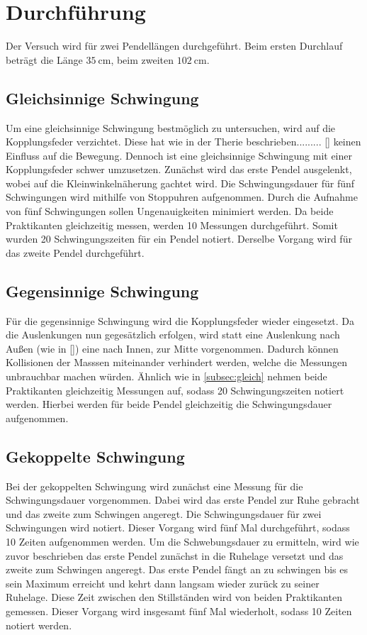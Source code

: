 \section{Durchführung}
\label{sec:Durchführung}
Der Versuch wird für zwei Pendellängen durchgeführt.
Beim ersten Durchlauf beträgt die Länge $\SI{35}{\centi\metre}$, beim zweiten $\SI{102}{\centi\metre}$.

\subsection{Gleichsinnige Schwingung}
\label{subsec:gleich}
Um eine gleichsinnige Schwingung bestmöglich zu untersuchen, wird auf die Kopplungsfeder verzichtet.
Diese hat wie in der Therie beschrieben......... \autoref{} keinen Einfluss auf die Bewegung.
Dennoch ist eine gleichsinnige Schwingung mit einer Kopplungsfeder schwer umzusetzen.
\noindent
Zunächst wird das erste Pendel ausgelenkt, wobei auf die Kleinwinkelnäherung gachtet wird.
Die Schwingungsdauer für fünf Schwingungen wird mithilfe von Stoppuhren aufgenommen.
Durch die Aufnahme von fünf Schwingungen sollen Ungenauigkeiten minimiert werden.
Da beide Praktikanten gleichzeitig messen, werden 10 Messungen durchgeführt.
Somit wurden 20 Schwingungszeiten für ein Pendel notiert.
Derselbe Vorgang wird für das zweite Pendel durchgeführt.

\subsection{Gegensinnige Schwingung}
Für die gegensinnige Schwingung wird die Kopplungsfeder wieder eingesetzt.
Da die Auslenkungen nun gegesätzlich erfolgen, wird statt eine Auslenkung nach Außen (wie in \autoref{})
eine nach Innen, zur Mitte vorgenommen. Dadurch können Kollisionen der Masssen miteinander verhindert werden,
welche die Messungen unbrauchbar machen würden.
Ähnlich wie in \autoref{subsec:gleich} nehmen beide Praktikanten gleichzeitig Messungen auf, sodass 20 Schwingungszeiten notiert werden.
Hierbei werden für beide Pendel gleichzeitig die Schwingungsdauer aufgenommen.

\subsection{Gekoppelte Schwingung}
Bei der gekoppelten Schwingung wird zunächst eine Messung für die Schwingungsdauer vorgenommen.
Dabei wird das erste Pendel zur Ruhe gebracht und das zweite zum Schwingen angeregt.
Die Schwingungsdauer für zwei Schwingungen wird notiert.
Dieser Vorgang wird fünf Mal durchgeführt, sodass 10 Zeiten aufgenommen werden.
\noindent
Um die Schwebungsdauer zu ermitteln, wird wie zuvor beschrieben das erste Pendel zunächst in die Ruhelage versetzt und das zweite zum Schwingen
angeregt.
Das erste Pendel fängt an zu schwingen bis es sein Maximum erreicht und kehrt dann langsam wieder zurück zu seiner Ruhelage.
Diese Zeit zwischen den Stillständen wird von beiden Praktikanten gemessen.
Dieser Vorgang wird insgesamt fünf Mal wiederholt, sodass 10 Zeiten notiert werden.